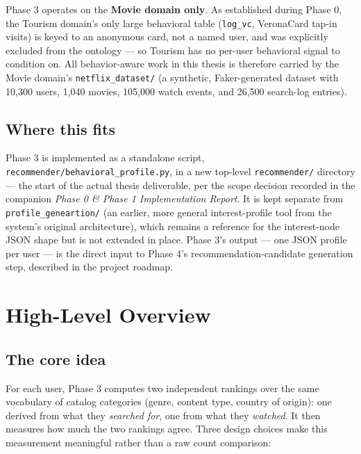\documentclass[11pt,a4paper]{article}
\newcommand{\code}[1]{\texttt{#1}}
\begin{document}
Phase 3 operates on the \textbf{Movie domain only}. As established during Phase 0, the Tourism
domain's only large behavioral table (\code{log\_vc}, VeronaCard tap-in visits) is keyed to an
anonymous card, not a named user, and was explicitly excluded from the ontology --- so Tourism has
no per-user behavioral signal to condition on. All behavior-aware work in this thesis is
therefore carried by the Movie domain's \code{netflix\_dataset/} (a synthetic, Faker-generated
dataset with 10{,}300 users, 1{,}040 movies, 105{,}000 watch events, and 26{,}500 search-log
entries).

\subsection{Where this fits}

Phase 3 is implemented as a standalone script, \code{recommender/behavioral\_profile.py}, in a
new top-level \code{recommender/} directory --- the start of the actual thesis deliverable,
per the scope decision recorded in the companion \emph{Phase 0 \& Phase 1 Implementation Report}.
It is kept separate from \code{profile\_geneartion/} (an earlier, more general interest-profile
tool from the system's original architecture), which remains a reference for the interest-node
JSON shape but is not extended in place. Phase 3's output --- one JSON profile per user --- is the
direct input to Phase 4's recommendation-candidate generation step, described in the project
roadmap.

\newpage
\section{High-Level Overview}

\subsection{The core idea}

For each user, Phase 3 computes two independent rankings over the same vocabulary of catalog
categories (genre, content type, country of origin): one derived from what they \emph{searched
for}, one from what they \emph{watched}. It then measures how much the two rankings agree. Three
design choices make this measurement meaningful rather than a raw count comparison:
\end{document}
